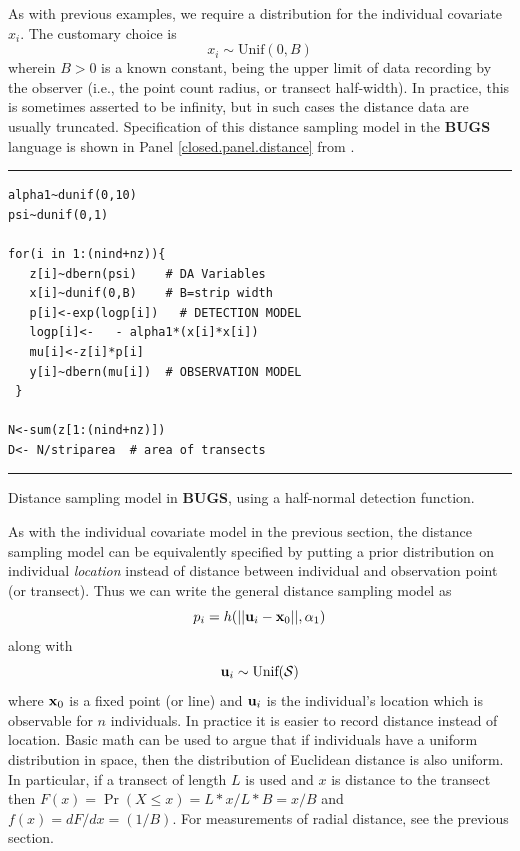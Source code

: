 As with previous examples, we require a distribution for the
individual covariate $x_{i}$. The customary choice is
\[
x_{i} \sim \mbox{Unif}(0,B)
\]
wherein $B>0$ is a known constant, being the upper limit of data
recording by the observer (i.e., the point count radius, or transect
half-width). In practice, this is sometimes asserted to be infinity,
but in such cases the distance data are usually truncated.
Specification of this distance sampling model in the {\bf BUGS} language is
shown in Panel \ref{closed.panel.distance} from \citet{royle_dorazio:2008}.


\begin{panel}[htp]
\centering
\rule[0.15in]{\textwidth}{.03in}
\begin{minipage}{5in}
\begin{verbatim}
alpha1~dunif(0,10)
psi~dunif(0,1)

for(i in 1:(nind+nz)){
   z[i]~dbern(psi)    # DA Variables
   x[i]~dunif(0,B)    # B=strip width
   p[i]<-exp(logp[i])   # DETECTION MODEL
   logp[i]<-   - alpha1*(x[i]*x[i])
   mu[i]<-z[i]*p[i]
   y[i]~dbern(mu[i])  # OBSERVATION MODEL
 }

N<-sum(z[1:(nind+nz)])
D<- N/striparea  # area of transects
\end{verbatim}
\end{minipage}
\rule[-0.15in]{\textwidth}{.03in}
\caption{Distance sampling model in {\bf BUGS}, using a half-normal
detection function.}
\label{closed.panel.distance}
\end{panel}

As with the individual covariate model in the previous section, the
distance sampling model can be equivalently specified by putting a
prior distribution on individual {\it location} instead of distance
between individual and observation point (or transect).  Thus we can
write the general distance sampling model as
\[
p_{i} = h(||{\bf u}_{i} - {\bf x}_0||,\alpha_{1})
\]
along with
\[
 {\bf u}_{i} \sim \mbox{Unif}({\cal S})
\]
where ${\bf x}_{0}$ is a fixed point (or line) and ${\bf u}_{i}$ is
the individual's location which is observable for $n$ individuals. In
practice it is easier to record distance instead of location.  Basic
math can be used to argue that if individuals have a uniform
distribution in space, then the distribution of Euclidean distance is
also uniform. In particular, if a transect of length $L$ is used and $x$
is distance to the transect then $F(x) = \Pr(X\le x) = L*x/L*B = x/B$ and
$f(x) = dF/dx = (1/B)$. For measurements of radial distance, see the
previous section.

